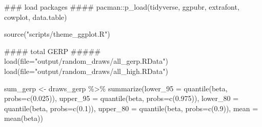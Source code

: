\documentclass[
  letterpaper,
  DIV=11,
  numbers=noendperiod]{scrreprt}
\newenvironment{Shaded}{}{}
\newcommand{\AttributeTok}[1]{\textcolor[rgb]{0.84,0.23,0.29}{#1}}
\newcommand{\DocumentationTok}[1]{\textcolor[rgb]{0.42,0.45,0.49}{#1}}
\newcommand{\FloatTok}[1]{\textcolor[rgb]{0.00,0.36,0.77}{#1}}
\newcommand{\FunctionTok}[1]{\textcolor[rgb]{0.44,0.26,0.76}{#1}}
\newcommand{\NormalTok}[1]{\textcolor[rgb]{0.14,0.16,0.18}{#1}}
\newcommand{\OtherTok}[1]{\textcolor[rgb]{0.44,0.26,0.76}{#1}}
\newcommand{\SpecialCharTok}[1]{\textcolor[rgb]{0.00,0.36,0.77}{#1}}
\newcommand{\StringTok}[1]{\textcolor[rgb]{0.01,0.18,0.38}{#1}}
\begin{document}
\begin{Shaded}
\begin{Highlighting}[]
\DocumentationTok{\#\#\# load packages \#\#\#\#}
\NormalTok{pacman}\SpecialCharTok{::}\FunctionTok{p\_load}\NormalTok{(tidyverse, ggpubr, extrafont, cowplot, data.table)}

\FunctionTok{source}\NormalTok{(}\StringTok{"scripts/theme\_ggplot.R"}\NormalTok{)}

\DocumentationTok{\#\#\#\# total GERP \#\#\#\#\#}
\FunctionTok{load}\NormalTok{(}\AttributeTok{file=}\StringTok{"output/random\_draws/all\_gerp.RData"}\NormalTok{)}
\FunctionTok{load}\NormalTok{(}\AttributeTok{file=}\StringTok{"output/random\_draws/all\_high.RData"}\NormalTok{)}

\NormalTok{sum\_gerp }\OtherTok{\textless{}{-}}\NormalTok{ draws\_gerp }\SpecialCharTok{\%\textgreater{}\%}
  \FunctionTok{summarize}\NormalTok{(}\AttributeTok{lower\_95 =} \FunctionTok{quantile}\NormalTok{(beta, }\AttributeTok{probs=}\FunctionTok{c}\NormalTok{(}\FloatTok{0.025}\NormalTok{)),}
            \AttributeTok{upper\_95 =} \FunctionTok{quantile}\NormalTok{(beta, }\AttributeTok{probs=}\FunctionTok{c}\NormalTok{(}\FloatTok{0.975}\NormalTok{)),}
            \AttributeTok{lower\_80 =} \FunctionTok{quantile}\NormalTok{(beta, }\AttributeTok{probs=}\FunctionTok{c}\NormalTok{(}\FloatTok{0.1}\NormalTok{)),}
            \AttributeTok{upper\_80 =} \FunctionTok{quantile}\NormalTok{(beta, }\AttributeTok{probs=}\FunctionTok{c}\NormalTok{(}\FloatTok{0.9}\NormalTok{)),}
            \AttributeTok{mean =} \FunctionTok{mean}\NormalTok{(beta))}


\end{Highlighting}
\end{Shaded}
\end{document}
